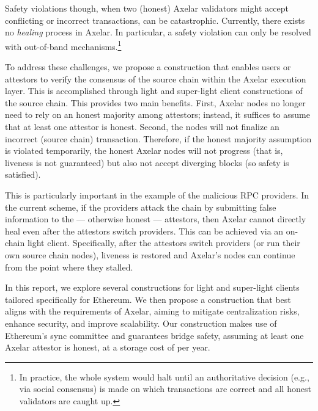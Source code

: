 Safety violations though, when two (honest) Axelar validators might accept conflicting or incorrect transactions, can be catastrophic.
Currently, there exists no \emph{healing} process in Axelar. In particular, a safety violation can only be resolved with out-of-band mechanisms.\footnote{In practice, the whole system would halt until an authoritative decision (e.g., via social consensus) is made on which transactions are correct and all honest validators are caught up.}



To address these challenges, we propose a construction that enables users or attestors to verify the consensus of the source chain within the Axelar execution layer. This is accomplished through light and super-light client constructions of the source chain. This provides two main benefits. First, Axelar nodes no longer need to rely on an honest majority among attestors; instead, it suffices to assume that at least one attestor is honest. Second, the nodes will not finalize an incorrect (source chain) transaction. Therefore, if the honest majority assumption is violated temporarily, the honest Axelar nodes will not progress (that is, liveness is not guaranteed) but also not accept diverging blocks (so safety is satisfied).

This is particularly important in the example of the malicious RPC providers. In the current scheme, if the providers attack the chain by submitting false information to the --- otherwise honest --- attestors, then Axelar cannot directly heal even after the attestors switch providers. This can be achieved via an on-chain light client. Specifically, after the attestors switch providers (or run their own source chain nodes), liveness is restored and Axelar's nodes can continue from the point where they stalled.

In this report, we explore several constructions for light and super-light clients tailored specifically for Ethereum. We then propose a construction that best aligns with the requirements of Axelar, aiming to mitigate centralization risks, enhance security, and improve scalability. Our construction makes use of Ethereum's sync committee and guarantees bridge safety, assuming at least one Axelar attestor is honest, at a storage cost of  per year.
